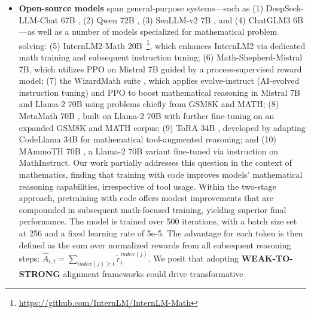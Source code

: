 \begin{itemize}[topsep=0pt]
\begin{itemize}[topsep=0pt]
\begin{itemize}[topsep=0pt]
This section details the development and evaluation of DeepSeekMath-Base 7B, a foundational model designed with robust mathematical reasoning skills. Together, these benchmarks span a variety of mathematical subfields, from elementary concepts up to those encountered at the undergraduate level. The initial reward model is fine-tuned from DeepSeekMath-Base 7B, using a learning rate of 2e-5. All training is implemented with the resource-efficient HAI-LLM framework \citep{haillm}. We further propose Group Relative Policy Optimization (GRPO), an adaptation of Proximal Policy Optimization (PPO), capable of substantially elevating mathematical reasoning while being more memory-efficient. Furthermore, since the DeepSeekMath Corpus encompasses multiple languages, we observe notable gains on Chinese mathematical benchmarks \citep{wei2023cmath,agieval}. Using OpenWebMath, we train a fastText classifier \citep{joulin2016fasttext} aimed at retrieving additional mathematical web documents resembling the seed set. With the exception of setting the maximum learning rate to 4.2e-4 and utilizing a batch size of 10M tokens, we largely adhere to the training protocol outlined in Section \ref{sec:quality-policy}. \item \textbf{Open-source models} span general-purpose systems—such as (1) DeepSeek-LLM-Chat 67B \citep{deepseek-llm}, (2) Qwen 72B \citep{qwen}, (3) SeaLLM-v2 7B \citep{seallm}, and (4) ChatGLM3 6B \citep{chatglm3}—as well as a number of models specialized for mathematical problem solving: (5) InternLM2-Math 20B~\footnote{\url{https://github.com/InternLM/InternLM-Math}}, which enhances InternLM2 via dedicated math training and subsequent instruction tuning; (6) Math-Shepherd-Mistral 7B, which utilizes PPO \citep{schulman2017proximal} on Mistral 7B \citep{mistral} guided by a process-supervised reward model; (7) the WizardMath suite \citep{wizardmath}, which applies evolve-instruct (AI-evolved instruction tuning) and PPO to boost mathematical reasoning in Mistral 7B and Llama-2 70B \citep{llama2} using problems chiefly from GSM8K and MATH; (8) MetaMath 70B \citep{metamath}, built on Llama-2 70B with further fine-tuning on an expanded GSM8K and MATH corpus; (9) ToRA 34B \cite{tora}, developed by adapting CodeLlama 34B for mathematical tool-augmented reasoning; and (10) MAmmoTH 70B \citep{MathInstruct}, a Llama-2 70B variant fine-tuned via instruction on MathInstruct. Our work partially addresses this question in the context of mathematics, finding that training with code improves models' mathematical reasoning capabilities, irrespective of tool usage. Within the two-stage approach, pretraining with code offers modest improvements that are compounded in subsequent math-focused training, yielding superior final performance. The model is trained over 500 iterations, with a batch size set at 256 and a fixed learning rate of 5e-5. The advantage for each token is then defined as the sum over normalized rewards from all subsequent reasoning steps: $\hat{A}_{i, t} = \sum_{index(j) \ge t} \widetilde{r}_i^{index(j)}$. We posit that adopting \textbf{WEAK-TO-STRONG} alignment frameworks \citep{burns2023weak} could drive transformative 
\end{itemize}
\end{itemize}
\end{itemize}
